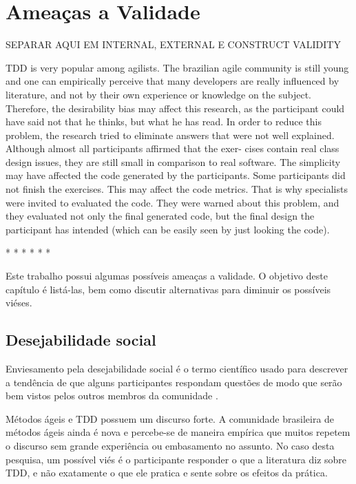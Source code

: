 \chapter{Ameaças a Validade}
\label{cap:ameacas}

SEPARAR AQUI EM INTERNAL, EXTERNAL E CONSTRUCT VALIDITY


TDD is very popular among agilists. The brazilian agile community is still young and one can empirically perceive that many developers are really influenced by literature, and not by their own experience or knowledge on the subject. Therefore, the desirability bias may affect this research, as the participant could have said not that he thinks, but what he has read. In order to reduce this problem, the research tried to eliminate answers that were not well explained.
Although almost all participants affirmed that the exer- cises contain real class design issues, they are still small in comparison to real software. The simplicity may have affected the code generated by the participants.
Some participants did not finish the exercises. This may affect the code metrics. That is why specialists were invited to evaluated the code. They were warned about this problem, and they evaluated not only the final generated code, but the final design the participant has intended (which can be easily seen by just looking the code).

* * * * * * 

Este trabalho possui algumas possíveis ameaças a validade. O objetivo
deste capítulo é listá-las, bem como discutir alternativas para diminuir
os possíveis viéses.

\section{Desejabilidade social}

Enviesamento pela desejabilidade social é o termo científico usado para descrever
a tendência de que alguns participantes respondam questões de modo que serão
bem vistos pelos outros membros da comunidade \cite{crowne}.

Métodos ágeis e TDD possuem um discurso forte. A comunidade brasileira de métodos
ágeis ainda é nova e percebe-se de maneira empírica que muitos repetem o discurso
sem grande experiência ou embasamento no assunto.
No caso desta pesquisa, um possível viés é o participante responder o que
a literatura diz sobre TDD, e não exatamente o que ele pratica e sente sobre
os efeitos da prática. 

